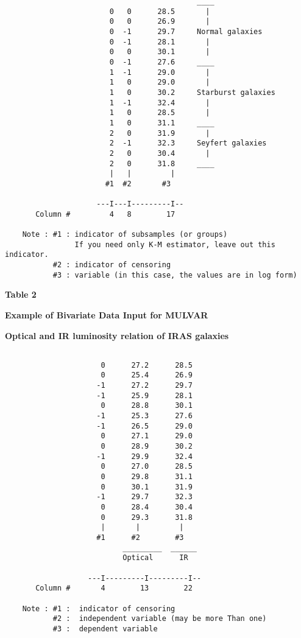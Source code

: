 \begin{verbatim}
                                            ____
                        0   0      28.5       |
                        0   0      26.9       |
                        0  -1      29.7     Normal galaxies
                        0  -1      28.1       |
                        0   0      30.1       |
                        0  -1      27.6     ____
                        1  -1      29.0       |
                        1   0      29.0       |
                        1   0      30.2     Starburst galaxies
                        1  -1      32.4       |
                        1   0      28.5       |
                        1   0      31.1     ____
                        2   0      31.9       |
                        2  -1      32.3     Seyfert galaxies
                        2   0      30.4       |
                        2   0      31.8     ____
                        |   |         |
                       #1  #2       #3

                     ---I---I---------I--
       Column #         4   8        17
   
    Note : #1 : indicator of subsamples (or groups)
                If you need only K-M estimator, leave out this indicator.
           #2 : indicator of censoring
           #3 : variable (in this case, the values are in log form)
\end{verbatim}
\newpage

\centerline{\Large\bf Table 2}

\bigskip
\bigskip

\centerline{\large\bf Example of Bivariate Data Input for MULVAR}

\bigskip

\centerline{\large\bf Optical and IR luminosity relation of IRAS galaxies}

\begin{verbatim}

                      0      27.2      28.5 
                      0      25.4      26.9
                     -1      27.2      29.7
                     -1      25.9      28.1  
                      0      28.8      30.1 
                     -1      25.3      27.6
                     -1      26.5      29.0   
                      0      27.1      29.0  
                      0      28.9      30.2 
                     -1      29.9      32.4
                      0      27.0      28.5
                      0      29.8      31.1 
                      0      30.1      31.9   
                     -1      29.7      32.3  
                      0      28.4      30.4 
                      0      29.3      31.8
                      |       |         |
                     #1      #2        #3
                           _________  ______
                           Optical      IR

                   ---I---------I---------I--
       Column #       4        13        22

    Note : #1 :  indicator of censoring
           #2 :  independent variable (may be more Than one)
           #3 :  dependent variable
\end{verbatim}
\newpage

